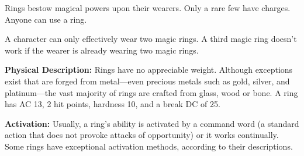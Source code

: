 Rings bestow magical powers upon their wearers. Only a rare few have charges. Anyone can use a ring.

A character can only effectively wear two magic rings. A third magic ring doesn't work if the wearer is already wearing two magic rings.

\textbf{Physical Description:} Rings have no appreciable weight. Although exceptions exist that are forged from metal---even precious metals such as gold, silver, and platinum---the vast majority of rings are crafted from glass, wood or bone. A ring has AC 13, 2 hit points, hardness 10, and a break DC of 25.

\textbf{Activation:} Usually, a ring's ability is activated by a command word (a standard action that does not provoke attacks of opportunity) or it works continually. Some rings have exceptional activation methods, according to their descriptions.

